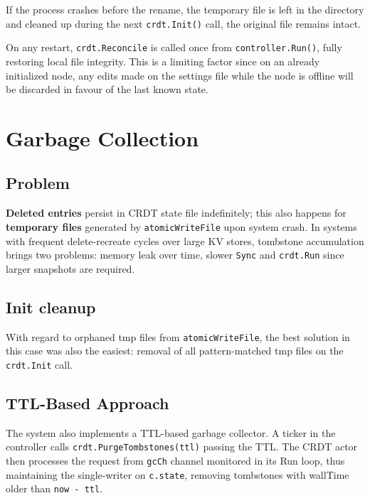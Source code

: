 \documentclass[conference]{IEEEtran}
\begin{document}
If the process crashes before the rename, the temporary file is
left in the directory and cleaned up during the next \texttt{crdt.Init()} call,
the original file remains intact.

On any restart, \texttt{crdt.Reconcile} is called once from \texttt{controller.Run()},
fully restoring local file integrity. This is a limiting factor since on an already initialized
node, any edits made on the settings file while the node is offline will be discarded in favour
of the last known state.

\section{Garbage Collection}
\label{sec:gc}

\subsection{Problem}

\textbf{Deleted entries} persist in CRDT state file indefinitely; this also
happens for \textbf{temporary files} generated by \texttt{atomicWriteFile} upon system
crash. In systems with frequent delete-recreate cycles over large KV stores,
tombstone accumulation brings two problems: memory leak over time,
slower \texttt{Sync} and \texttt{crdt.Run} since larger snapshots are required.

\subsection{Init cleanup}

With regard to orphaned tmp files from \texttt{atomicWriteFile}, the best solution in this case
was also the easiest: removal of all pattern-matched tmp files on the \texttt{crdt.Init} call.

\subsection{TTL-Based Approach}

The system also implements a TTL-based garbage collector. A ticker in the
controller calls \texttt{crdt.PurgeTombstones(ttl)} passing the TTL.
The CRDT actor then processes the request from \texttt{gcCh} channel monitored
in its Run loop, thus maintaining the single-writer on \texttt{c.state}, removing
tombstones with wallTime older than \texttt{now - ttl}.
\end{document}
